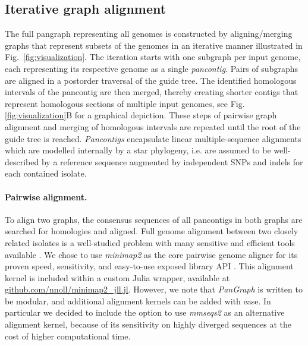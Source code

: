 \documentclass[aps,rmp,preprint,superscriptaddress,10pt,linenumbers]{revtex4-1}
\begin{document}
\subsection{Iterative graph alignment}
The full pangraph representing all genomes is constructed by aligning/merging graphs that represent subsets of the genomes in an iterative manner illustrated in Fig.~\ref{fig:visualization}.
The iteration starts with one subgraph per input genome, each representing its respective genome as a single \emph{pancontig}.
Pairs of subgraphs are aligned in a postorder traversal of the guide tree.
The identified homologous intervals of the pancontig are then merged, thereby creating shorter contigs that represent homologous sections of multiple input genomes, see Fig. \ref{fig:visualization}B for a graphical depiction.
These steps of pairwise graph alignment and merging of homologous intervals are repeated until the root of the guide tree is reached.
\emph{Pancontigs} encapsulate linear multiple-sequence alignments which are modelled internally by a star phylogeny, i.e. are assumed to be well-described by a reference sequence augmented by independent SNPs and indels for each contained isolate.

\paragraph*{Pairwise alignment.}
To align two graphs, the consensus sequences of all pancontigs in both graphs are searched for homologies and aligned.
Full genome alignment between two closely related isolates is a well-studied problem with many sensitive and efficient tools available \cite{li2018minimap2,marccais2018mummer4}.
We chose to use \emph{minimap2} as the core pairwise genome aligner for its proven speed, sensitivity, and easy-to-use exposed library API \cite{li2018minimap2}.
This alignment kernel is included within a custom Julia wrapper, available at \url{github.com/nnoll/minimap2_jll.jl}.
However, we note that \emph{PanGraph} is written to be modular, and additional alignment kernels can be added with ease.
In particular we decided to include the option to use \emph{mmseqs2} \cite{steinegger2017mmseqs2} as an alternative alignment kernel, because of its sensitivity on highly diverged sequences at the cost of higher computational time.
\end{document}
